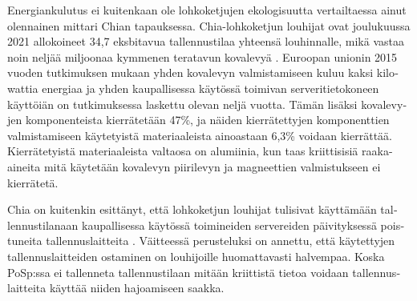 \begin{otherlanguage}{english}
Energiankulutus ei kuitenkaan ole lohkoketjujen ekologisuutta vertailtaessa ainut olennainen mittari Chian tapauksessa. Chia-lohkoketjun louhijat ovat joulukuussa 2021 allokoineet 34,7 eksbitavua tallennustilaa yhteensä louhinnalle, mikä vastaa noin neljää miljoonaa kymmenen teratavun kovalevyä \cite{chiaspaceusage}. Euroopan unionin 2015 vuoden tutkimuksen mukaan yhden kovalevyn valmistamiseen kuluu kaksi kilowattia energiaa \cite[p~49--50]{manufacturingcarbon1} ja yhden kaupallisessa käytössä toimivan serveritietokoneen käyttöiän on tutkimuksessa laskettu olevan neljä vuotta. Tämän lisäksi kovalevyjen komponenteista kierrätetään 47\%, ja näiden kierrätettyjen komponenttien valmistamiseen käytetyistä materiaaleista ainoastaan 6,3\% voidaan kierrättää. Kierrätetyistä materiaaleista valtaosa on alumiinia, kun taas kriittisisiä raaka-aineita mitä käytetään kovalevyn piirilevyn ja magneettien valmistukseen ei kierrätetä.

Chia on kuitenkin esittänyt, että lohkoketjun louhijat tulisivat käyttämään tallennustilanaan kaupallisessa käytössä toimineiden servereiden päivityksessä poistuneita tallennuslaitteita \cite{chia-mining}. Väitteessä perusteluksi on annettu, että käytettyjen tallennuslaitteiden ostaminen on louhijoille huomattavasti halvempaa. Koska PoSp:ssa ei tallenneta tallennustilaan mitään kriittistä tietoa voidaan tallennuslaitteita käyttää niiden hajoamiseen saakka.

\end{otherlanguage}